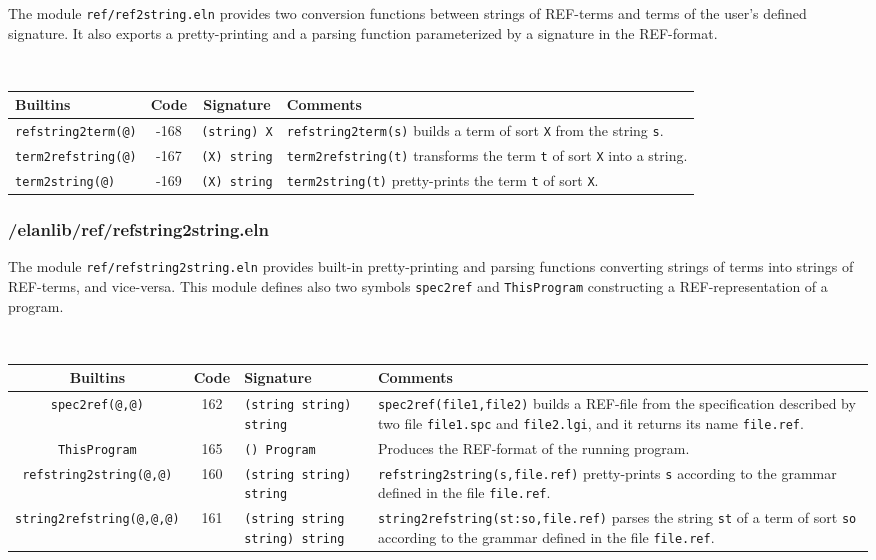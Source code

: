
The module {\tt ref/ref2string.eln} provides two conversion functions
between strings of REF-terms and terms of the user's defined signature.
It also exports a pretty-printing and a parsing function parameterized
by a signature in the REF-format.

~\\
\begin{tabular}{|l|c|c|p{8cm}|}
\hline
{\bf Builtins} & {\bf Code} & {\bf Signature} & {\bf Comments} \\
\hline
\hline
{\tt refstring2term(@)}         & -168 & {\tt (string) X} & {\tt refstring2term(s)} builds a term of sort {\tt X} from the string {\tt s}.\\
{\tt term2refstring(@)}         & -167 & {\tt (X) string} & {\tt term2refstring(t)} transforms the term {\tt t} of sort {\tt X} into a string.\\
{\tt term2string(@)}            & -169 & {\tt (X) string} & {\tt term2string(t)} pretty-prints the term {\tt t} of sort {\tt X}.\\
\hline
\end{tabular}


\subsubsection{/elanlib/ref/refstring2string.eln}


The module {\tt ref/refstring2string.eln} provides built-in
pretty-printing and parsing functions converting strings of terms into
strings of REF-terms, and vice-versa.
%
This module defines also two symbols {\tt spec2ref} and 
{\tt ThisProgram} constructing a REF-representation of a program.

~\\
\begin{tabular}{|c|c|p{3cm}|p{}|}
\hline
{\bf Builtins} & {\bf Code} & {\bf Signature} & {\bf Comments} \\
\hline
\hline
{\tt spec2ref(@,@)}             & 162 & {\tt (string string) string} & {\tt spec2ref(file1,file2)} builds a REF-file from the specification
described by two file {\tt file1.spc} and {\tt file2.lgi}, and it returns its name {\tt file.ref}.\\
{\tt ThisProgram}               & 165 & {\tt () Program} & Produces the REF-format of the running program.\\
{\tt refstring2string(@,@)}     & 160 & {\tt (string string) string} & {\tt refstring2string(s,file.ref)} pretty-prints {\tt s} according to
the grammar defined in the file {\tt file.ref}.\\
{\tt string2refstring(@,@,@)}   & 161 & {\tt (string string string) string} & {\tt string2refstring(st:so,file.ref)} parses the string {\tt st} of a term of sort {\tt so} according to the grammar defined in the file {\tt file.ref}.\\
\hline
\end{tabular}
